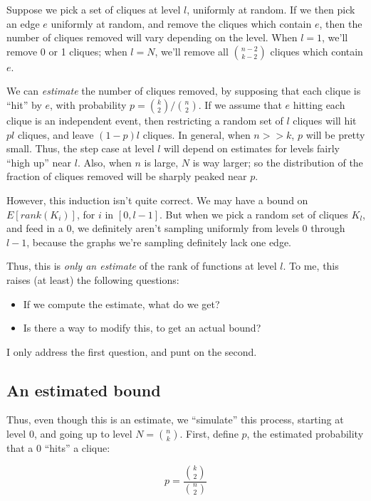 \documentclass[12pt]{article}
\theoremstyle{definition}
\begin{document}
Suppose we pick a set of cliques at level $l$, uniformly at random.
If we then pick an edge $e$ uniformly at random, and remove the cliques
which contain $e$, then the number of cliques removed will vary
depending on the level. When $l=1$, we'll remove 0 or 1 cliques; when $l=N$,
we'll remove all ${n-2 \choose k-2}$ cliques which contain $e$.

We can {\em estimate} the number of cliques removed, by supposing that each
clique is ``hit'' by $e$, with probability $p = {k \choose 2} / {n \choose 2}$.
If we assume that $e$ hitting each clique is an independent event, then
restricting a random set of $l$ cliques will hit $pl$ cliques, and
leave $(1-p)l$ cliques.
In general, when $n>>k$, $p$ will be pretty small. Thus, the step case at
level $l$ will depend on estimates for levels fairly ``high up'' near $l$.
Also, when $n$ is large, $N$ is way larger; so the distribution of
the fraction of cliques removed will be sharply peaked near $p$.

However, this induction isn't quite correct.
We may have a bound on $E[rank(K_i)]$, for $i$ in $[0,l-1]$.
But when we pick a random set of cliques $K_l$, and feed in a 0, we definitely
aren't sampling uniformly from levels 0 through $l-1$, because the graphs we're
sampling definitely lack one edge.

Thus, this is {\em only an estimate} of the rank of functions at level $l$.
To me, this raises (at least) the following questions:

\begin{itemize}

\item If we compute the estimate, what do we get?

\item Is there a way to modify this, to get an actual bound?

\end{itemize}

I only address the first question, and punt on the second.

\subsection{An estimated bound}

Thus, even though this is an estimate, we ``simulate'' this process, starting
at level 0, and going up to level $N = {n \choose k}$. 
First, define $p$, the estimated probability that a 0 ``hits'' a clique:

\[ p = \frac{{k \choose 2}}{{n \choose 2}} \]
\end{document}
